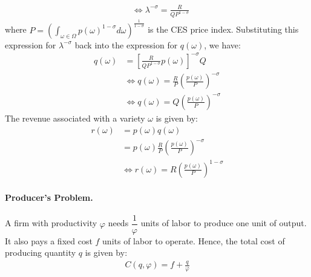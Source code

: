 \begin{solution}
\begin{align*}
        &\iff \lambda^{-\sigma} = \frac{R}{Q P^{1 - \sigma}} 
    \end{align*}
    where $P = \left( \int_{\omega \in \Omega} p(\omega)^{1 - \sigma} d\omega \right)^{\frac{1}{1 - \sigma}}$ is the CES price index. Substituting this expression for $\lambda^{-\sigma}$ back into the expression for $q(\omega)$, we have:
    \begin{align*}
        q(\omega) &= \left[ \frac{R}{Q P^{1 - \sigma}} p(\omega) \right]^{-\sigma} Q \\
        &\iff q(\omega) = \frac{R}{P} \left( \frac{p(\omega)}{P} \right)^{-\sigma}\\
        &\iff q(\omega) = Q \left( \frac{p(\omega)}{P} \right)^{-\sigma}
    \end{align*}
    The revenue associated with a variety $\omega$ is given by:
    \begin{align*}
        r(\omega) &= p(\omega) q(\omega) \\
        &= p(\omega) \frac{R}{P} \left( \frac{p(\omega)}{P} \right)^{-\sigma} \\
        &\iff r(\omega) = R \left( \frac{p(\omega)}{P} \right)^{1 - \sigma}
    \end{align*}
    
    \paragraph{Producer's Problem.} A firm with productivity $\varphi$ needs $\dfrac{1}{\varphi}$ units of labor to produce one unit of output. It also pays a fixed cost $f$ units of labor to operate. Hence, the total cost of producing quantity $q$ is given by:
    \begin{align*}
        C(q, \varphi) = f + \frac{q}{\varphi} 
    \end{align*}
    

\end{solution}
